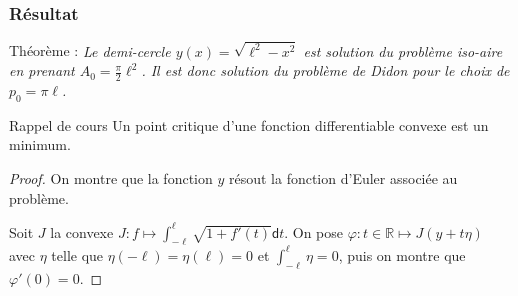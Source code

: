 \documentclass[11pt,envcountsect,aspectratio=169]{beamer} %
\newcommand{\R}{\mathbb{R}}
\renewcommand{\d}{\mathsf{d}}
\renewcommand{\phi}{\varphi}
\newcommand\thm[2]{%
    \begin{beamerboxesrounded}[upper=titreB,lower=texteB,shadow=true]{Théorème : #1}
        \it #2
    \end{beamerboxesrounded}
    \normalfont
}
\begin{document}
\begin{frame}
    \frametitle{Résultat}

    \thm{}{%
        Le demi-cercle $y(x)=\sqrt{\ell^2-x^2}$ est solution du problème iso-aire en prenant $A_0=\frac{\pi}{2}\ell^2$. Il est donc solution du problème de Didon pour le choix de $p_0=\pi\ell$.
    }

    \begin{beamerboxesrounded}[upper=titreV,lower=texteV,shadow=true]{Rappel de cours}
        Un point critique d'une fonction differentiable convexe est un minimum.
    \end{beamerboxesrounded}



    \begin{proof}

    On montre que la fonction $y$ résout la fonction d'Euler associée au problème.
    
    Soit $J$ la convexe $J\colon f\mapsto \int_{-\ell}^\ell \sqrt{1+f'(t)}\d t$.
    On pose $\phi\colon t\in\R\mapsto J(y+t\eta)$ avec $\eta$ telle que $\eta(-\ell)=\eta(\ell)=0$ et $\int_{-\ell}^\ell \eta=0$, puis on montre que $\phi'(0)=0$.
    \end{proof}
\end{frame}
    
\end{document}
